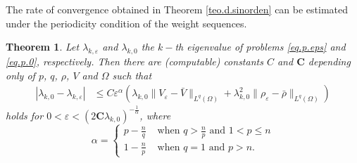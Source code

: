\documentclass[12pt]{amsart}
\newtheorem{thm}{Theorem}[section]
\theoremstyle{definition}
\theoremstyle{remark}
\numberwithin{equation}{section}
\begin{document}
The rate of convergence obtained in Theorem \ref{teo.d.sinorden} can be estimated under the periodicity condition of the weight sequences.

\begin{thm} \label{teo.d}
  Let $\lambda_{k,\varepsilon}$ and $\lambda_{k,0}$ the $k-$th eigenvalue of problems \eqref{eq.p.eps} and \eqref{eq.p.0}, respectively. Then there are (computable) constants $C$ and $\textbf{C}$ depending only of $p$, $q$, $\rho$, $V$ and $\Omega$ such that
\begin{align*}
|\lambda_{k,0}-\lambda_{k,\varepsilon}| &\leq  
C  \varepsilon^\alpha \left(\lambda_{k,0} \|V_\varepsilon - \bar V\|_{L^q(\Omega)}  +  \lambda_{k,0}^2 \|\rho_\varepsilon - \bar \rho\|_{L^q(\Omega)}  \right)
\end{align*}
holds for $0<\varepsilon<(2\textbf{C} \lambda_{k,0})^{-\frac{1}{\alpha}}$, where
$$
\alpha=
\begin{cases}
p-\frac{n}{q} & \text{ when } q> \frac{n}{p} \text{ and } 1<p\leq n\\
1-\frac{n}{p} & \text{ when } q=1 \text{ and } p>n.
\end{cases}
$$
\end{thm}
\end{document}
